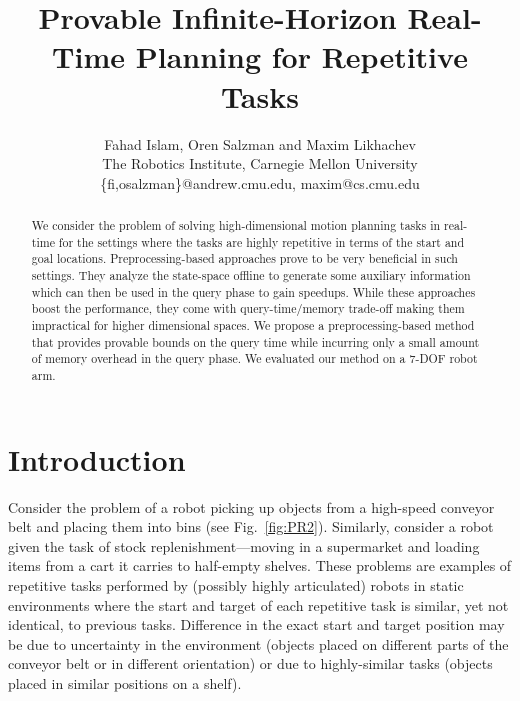 \documentclass[letterpaper, 10 pt, conference]{ieeeconf}  %
\title{\LARGE \bf
Provable Infinite-Horizon Real-Time Planning for Repetitive Tasks
}
\author{
Fahad Islam,
Oren Salzman {\normalfont and}
Maxim Likhachev
\\
The Robotics Institute, Carnegie Mellon University\\
%
\{fi,osalzman\}@andrew.cmu.edu,
maxim@cs.cmu.edu
}
\begin{document}
\maketitle
\thispagestyle{empty}
\pagestyle{empty}


\begin{abstract}

We consider the problem of solving high-dimensional motion planning tasks in real-time for the settings where the tasks are highly repetitive in terms of the start and goal locations. Preprocessing-based approaches prove to be very beneficial in such settings. They analyze the state-space offline to generate some auxiliary information which can then be used in the query phase to gain speedups. While these approaches boost the performance, they come with query-time/memory trade-off making them impractical for higher dimensional spaces. We propose a preprocessing-based method that provides provable bounds on the query time while incurring only a small amount of memory overhead in the query phase. We evaluated our method on a 7-DOF robot arm.

\end{abstract}

\section{Introduction}

Consider the problem of a robot picking up objects from a high-speed conveyor belt and placing them into bins (see Fig.~\ref{fig:PR2}).
Similarly, consider a robot given the task of stock replenishment---moving in a supermarket and loading items from a cart it carries to half-empty shelves.
These problems are examples of repetitive tasks performed by (possibly highly articulated) robots in static environments where the start and target of each repetitive task is similar, yet not identical, to previous tasks.
Difference in the exact start and target position may be due to uncertainty in the environment (objects placed on different parts of the conveyor belt or in different orientation) or due to highly-similar tasks (objects placed in similar positions on a shelf).
\end{document}
